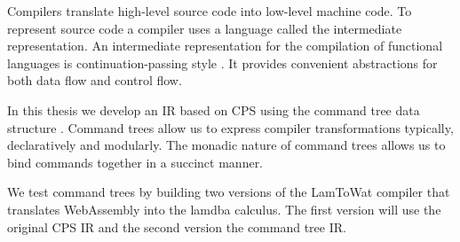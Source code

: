 
Compilers translate high-level source code into low-level machine code. To represent source code a compiler uses a language called the intermediate representation. An intermediate representation for the compilation of functional languages is continuation-passing style \autocite{steele1978rabbit, DBLP:books/daglib/0022396}. It provides convenient abstractions for both data flow and control flow.

In this thesis we develop an IR based on CPS using the command tree data structure \autocite{commandtreespoulsen}. Command trees allow us to express compiler transformations typically, declaratively and modularly. The monadic nature of command trees allows us to bind commands together in a succinct manner.

We test command trees by building two versions of the LamToWat compiler that translates WebAssembly into the lamdba calculus. The first version will use the original CPS IR and the second version the command tree IR.